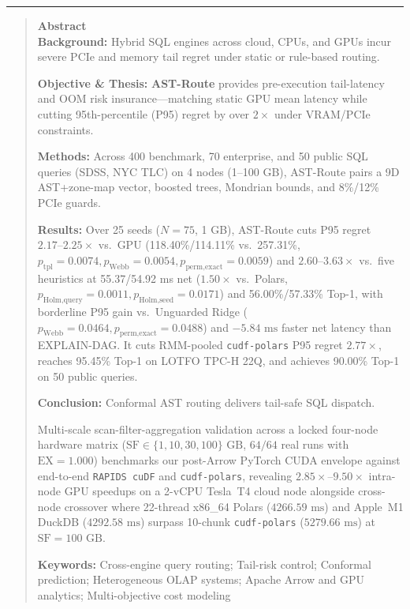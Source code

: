 \documentclass[10pt,a4paper]{article}
\begin{document}
\noindent\rule{\textwidth}{0.8pt}
\begin{quote}
\small\sffamily
\textbf{\color{springerblue}Abstract}\\[0.3em]
\textbf{Background:} Hybrid SQL engines across cloud, CPUs, and GPUs incur severe PCIe and memory tail regret under static or rule-based routing.

\textbf{Objective \& Thesis:} \textbf{AST-Route} provides pre-execution tail-latency and OOM risk insurance---matching static GPU mean latency while cutting 95th-percentile (P95) regret by over $2\times$ under VRAM/PCIe constraints.

\textbf{Methods:} Across 400 benchmark, 70 enterprise, and 50 public SQL queries (SDSS, NYC TLC) on 4 nodes (1--100 GB), AST-Route pairs a 9D AST+zone-map vector, boosted trees, Mondrian bounds, and 8\%/12\% PCIe guards.

\textbf{Results:} Over 25 seeds ($N=75$, 1 GB), AST-Route cuts P95 regret $2.17\text{--}2.25\times$ vs.\ GPU (118.40\%/114.11\% vs.\ 257.31\%, $p_{\text{tpl}}=0.0074, p_{\text{Webb}}=0.0054, p_{\text{perm,exact}}=0.0059$) and $2.60\text{--}3.63\times$ vs.\ five heuristics at 55.37/54.92 ms net ($1.50\times$ vs.\ Polars, $p_{\text{Holm,query}}=0.0011, p_{\text{Holm,seed}}=0.0171$) and 56.00\%/57.33\% Top-1, with borderline P95 gain vs.\ Unguarded Ridge ($p_{\text{Webb}}=0.0464, p_{\text{perm,exact}}=0.0488$) and $-5.84\text{ ms}$ faster net latency than EXPLAIN-DAG. It cuts RMM-pooled \texttt{cudf-polars} P95 regret $2.77\times$, reaches 95.45\% Top-1 on LOTFO TPC-H 22Q, and achieves 90.00\% Top-1 on 50 public queries.

\textbf{Conclusion:} Conformal AST routing delivers tail-safe SQL dispatch.

Multi-scale scan-filter-aggregation validation across a locked four-node hardware matrix ($\text{SF}\in\{1,10,30,100\}\text{ GB}$, $64/64$ real runs with $\text{EX}=1.000$) benchmarks our post-Arrow PyTorch CUDA envelope against end-to-end \texttt{RAPIDS cuDF} and \texttt{cudf-polars}, revealing $2.85\times\text{--}9.50\times$ intra-node GPU speedups on a 2-vCPU Tesla~T4 cloud node alongside cross-node crossover where 22-thread x86\_64 Polars ($4266.59\text{ ms}$) and Apple~M1 DuckDB ($4292.58\text{ ms}$) surpass 10-chunk \texttt{cudf-polars} ($5279.66\text{ ms}$) at $\text{SF}=100\text{ GB}$.

\noindent\textbf{Keywords:} Cross-engine query routing; Tail-risk control; Conformal prediction; Heterogeneous OLAP systems; Apache Arrow and GPU analytics; Multi-objective cost modeling
\end{quote}
\end{document}
